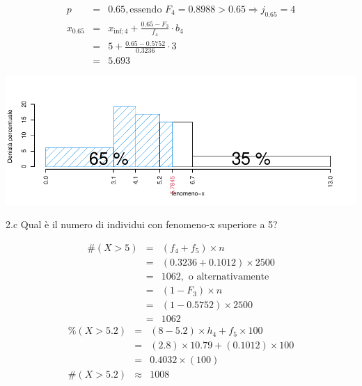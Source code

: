 \documentclass[
  11pt,
]{book}
\theoremstyle{mytheoremstyle}
\theoremstyle{mydefstyle}
\newenvironment{sol}
  {
  \begin{tcolorbox}[enhanced,breakable,arc=0.1mm,boxrule=1pt,colback=white,colframe=iblue,
  title=\bf \fontfamily{lmss}\selectfont \hspace{.5 cm} Soluzione,drop fuzzy shadow]

}{
\end{tcolorbox}
  }
\begin{document}
\begin{sol}

\begin{eqnarray*}
  p &=&  0.65 , \text{essendo }F_{ 4 }= 0.8988  > 0.65  \Rightarrow j_{ 0.65 }= 4 \\
  x_{ 0.65 } &=& x_{\text{inf}; 4 } + \frac{ { 0.65 } - F_{ 3 }} {f_{ 4 }} \cdot b_{ 4 } \\
            &=&  5  + \frac {{ 0.65 } -  0.5752 } { 0.3236 } \cdot  3  \\
            &=&  5.693 
\end{eqnarray*}

\begin{center}\includegraphics{Esami_passati_con_soluzioni_files/figure-latex/6-1} \end{center}

\end{sol}

2.c Qual è il numero di individui con fenomeno-x superiore a 5?

\begin{sol}
\begin{eqnarray*}
  \#(X>5) &=&  (f_4+f_5)\times n\\
            &=& (0.3236+0.1012)\times 2500\\
            &=& 1062,\text{ o alternativamente}\\
            &=& (1-F_3)\times n\\
            &=& (1-0.5752)\times 2500\\
            &=& 1062
\end{eqnarray*}
\begin{eqnarray*}
     \%(X> 5.2 ) &=& ( 8 - 5.2 )\times h_{ 4 }+ f_{ 5 }\times 100 \\
              &=& ( 2.8 )\times 10.79 + ( 0.1012 )\times 100 \\
              &=&  0.4032 \times(100)\\
     \#(X> 5.2 ) &\approx& 1008 
         \end{eqnarray*}

\end{sol}
\end{document}
